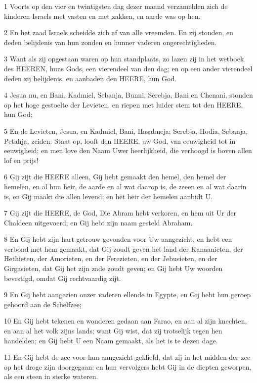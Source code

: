 \par 1 Voorts op den vier en twintigsten dag dezer maand verzamelden zich de kinderen Israels met vasten en met zakken, en aarde was op hen.
\par 2 En het zaad Israels scheidde zich af van alle vreemden. En zij stonden, en deden belijdenis van hun zonden en hunner vaderen ongerechtigheden.
\par 3 Want als zij opgestaan waren op hun standplaats, zo lazen zij in het wetboek des HEEREN, huns Gods, een vierendeel van den dag; en op een ander vierendeel deden zij belijdenis, en aanbaden den HEERE, hun God.
\par 4 Jesua nu, en Bani, Kadmiel, Sebanja, Bunni, Serebja, Bani en Chenani, stonden op het hoge gestoelte der Levieten, en riepen met luider stem tot den HEERE, hun God;
\par 5 En de Levieten, Jesua, en Kadmiel, Bani, Hasabneja; Serebja, Hodia, Sebanja, Petahja, zeiden: Staat op, looft den HEERE, uw God, van eeuwigheid tot in eeuwigheid; en men love den Naam Uwer heerlijkheid, die verhoogd is boven allen lof en prijs!
\par 6 Gij zijt die HEERE alleen, Gij hebt gemaakt den hemel, den hemel der hemelen, en al hun heir, de aarde en al wat daarop is, de zeeen en al wat daarin is, en Gij maakt die allen levend; en het heir der hemelen aanbidt U.
\par 7 Gij zijt die HEERE, de God, Die Abram hebt verkoren, en hem uit Ur der Chaldeen uitgevoerd; en Gij hebt zijn naam gesteld Abraham.
\par 8 En Gij hebt zijn hart getrouw gevonden voor Uw aangezicht, en hebt een verbond met hem gemaakt, dat Gij zoudt geven het land der Kanaanieten, der Hethieten, der Amorieten, en der Ferezieten, en der Jebusieten, en der Girgasieten, dat Gij het zijn zade zoudt geven; en Gij hebt Uw woorden bevestigd, omdat Gij rechtvaardig zijt.
\par 9 En Gij hebt aangezien onzer vaderen ellende in Egypte, en Gij hebt hun geroep gehoord aan de Schelfzee;
\par 10 En Gij hebt tekenen en wonderen gedaan aan Farao, en aan al zijn knechten, en aan al het volk zijns lands; want Gij wist, dat zij trotselijk tegen hen handelden; en Gij hebt U een Naam gemaakt, als het is te dezen dage.
\par 11 En Gij hebt de zee voor hun aangezicht gekliefd, dat zij in het midden der zee op het droge zijn doorgegaan; en hun vervolgers hebt Gij in de diepten geworpen, als een steen in sterke wateren.

